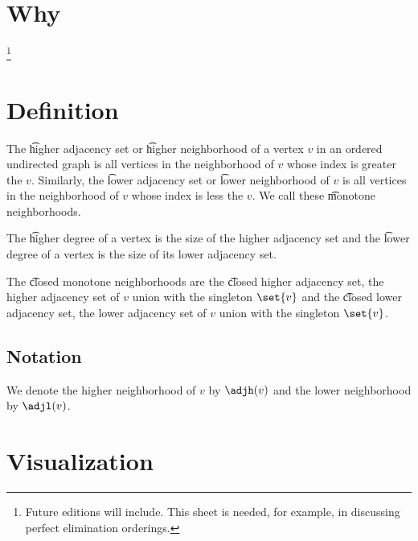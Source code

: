 
\section*{Why}
\footnote{Future editions will include. This sheet is needed, for example, in discussing perfect elimination orderings.}
\section*{Definition}

The \t{higher adjacency set} or \t{higher neighborhood} of a vertex $v$ in an ordered undirected graph is all vertices in the neighborhood of $v$ whose index is greater the $v$.
Similarly, the \t{lower adjacency set} or \t{lower neighborhood} of $v$ is all vertices in the neighborhood of $v$ whose index is less the $v$.
We call these \t{monotone neighborhoods}.

The \t{higher degree} of a vertex is the size of the higher adjacency set and the \t{lower degree} of a vertex is the size of its lower adjacency set.

The \t{closed monotone neighborhoods} are the \t{closed higher adjacency set}, the higher adjacency set of $v$ union with the singleton $\set{v}$ and the \t{closed lower adjacency set}, the lower adjacency set of $v$ union with the singleton $\set{v}$.

\subsection*{Notation}

We denote the higher neighborhood of $v$ by $\adjh(v)$ and the lower neighborhood by $\adjl(v)$.

\section*{Visualization}



